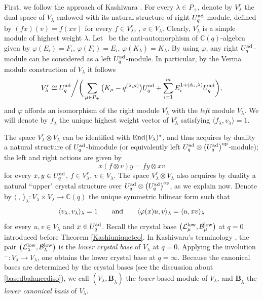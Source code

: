 \documentclass[pdftex]{sigma}
\numberwithin{equation}{section}
\theoremstyle{definition}
\newcommand{\mc}{\mathbb{C}}
\newcommand{\Ll}{{\mathcal L}}
\newcommand{\ra}{\rightarrow}
\begin{document}
First, we follow the approach of Kashiwara \cite{Kashiwara2,Kashiwara3}. For every $\lambda\in P_+$, denote by $V_\lambda^r$ the dual space of $V_\lambda$ endowed with its natural structure of right $U_q^{\rm ad}$-module, defined by ${(f x)(v) = f(xv)}$
for every $f\in V_\lambda^r$, , $v\in V_\lambda$.
Clearly, $V_\lambda^r$ is a simple module of highest weight $\lambda$.
 Let~\smash{$\varphi\colon U_q^{\rm ad} \ra U_q^{\rm ad}$} be the anti-automorphism of $\mc(q)$-algebra given by $\varphi(E_i) = F_i$, $\varphi(F_i) = E_i$, $\varphi(K_\lambda) = K_{\lambda}$. By using $\varphi$, any right $U_q^{\rm ad}$-module can be considered as a left $U_q^{\rm ad}$-module. In particular, by the Verma module construction of $V_\lambda$ it follows
\[V_\lambda^r \cong U_q^{\rm ad}\bigg/\bigg(\sum_{\mu\in P_+} \big(K_\mu -q^{(\lambda,\mu)}\big)U_q^{\rm ad}+ \sum_{i=1}^m E_i^{1+(\check{\alpha}_i,\lambda)}U_q^{\rm ad}\bigg),\]
and $\varphi$ affords an isomorphism of the right module $V_\lambda^r$ with the {\it left} module $V_\lambda$. We will denote by $f_\lambda$ the unique highest weight vector of $V_\lambda^r$ satisfying $\langle f_\lambda,v_\lambda\rangle = 1$.

The space $V_\lambda^r \otimes V_\lambda$ can be identified with ${\rm End}(V_\lambda)^*$, and thus acquires by duality a natural structure of $U_q^{\rm ad}$-bimodule \big(or equivalently left $U_q^{\rm ad} \otimes \big(U_q^{\rm ad}\big)^{\rm op}$-module\big); the left and right actions are given by
\begin{equation}\label{bimodaction}x(f \otimes v)y = fy \otimes xv
\end{equation}
for every $x,y\in U_q^{\rm ad}$, $f\in V_\lambda^r$, $v\in V_\lambda$. The space $V_\lambda^r \otimes V_\lambda$ also acquires by duality a natural ``upper" crystal structure over $U_q^{\rm ad} \otimes \big(U_q^{\rm ad}\big)^{\rm op}$, as we explain now. Denote by $\langle \ ,\ \rangle_\lambda \colon V_\lambda \times V_\lambda \ra \mc(q)$ the unique symmetric bilinear form such that
\begin{equation}\label{proppairinglambda}
\langle v_\lambda,v_\lambda\rangle_\lambda =1\qquad{\rm and}\qquad \langle \varphi(x)u,v\rangle_\lambda = \langle u, xv\rangle_\lambda
\end{equation}
for every $u,v\in V_\lambda$ and $x\in U_q^{\rm ad}$. Recall the crystal base $\big(\Ll_\mu^{\rm low},\mathcal{B}_\mu^{\rm low}\big)$ at $q=0$ introduced before Theorem \ref{Kashiuniqueteo}. In Kashiwara's terminology \cite{Kashiwara1, Kashiwara2}, the pair $\big(\Ll_{\lambda}^{\rm low},\mathcal{B}_\lambda^{\rm low}\big)$ is the {\it lower crystal base} of $V_\lambda$ at $q=0$. Applying the involution ${}^-\colon V_\lambda\ra V_\lambda$, one obtains the lower crystal base \smash{$\big(\overline{\Ll_{\lambda}^{\rm low}},\overline{\mathcal{B}_\lambda^{\rm low}}\big)$} at $q=\infty$. Because the canonical bases are determined by the crystal bases (see the discussion about \eqref{basedbalancediso}), we call $(V_\lambda,\underline{\mathbf{B}}_\lambda)$ the {\it lower} based module of $V_\lambda$, and $\underline{\mathbf{B}}_\lambda$ the {\it lower canonical basis} of $V_\lambda$.
\end{document}

